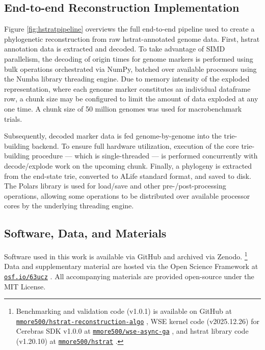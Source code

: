 \subsection{End-to-end Reconstruction Implementation}
\label{sec:pipeline}



Figure \ref{fig:hstratpipeline} overviews the full end-to-end pipeline used to create a phylogenetic reconstruction from raw hstrat-annotated genome data.
First, hstrat annotation data is extracted and decoded.
To take advantage of SIMD parallelism, the decoding of origin times for genome markers is performed using bulk operations orchestrated via NumPy, batched over available processors using the Numba library threading engine.
Due to memory intensity of the exploded representation, where each genome marker constitutes an individual dataframe row, a chunk size may be configured to limit the amount of data exploded at any one time.
A chunk size of 50 million genomes was used for macrobenchmark trials.

Subsequently, decoded marker data is fed genome-by-genome into the trie-building backend.
To ensure full hardware utilization, execution of the core trie-building procedure --- which is single-threaded --- is performed concurrently with decode/explode work on the upcoming chunk.
Finally, a phylogeny is extracted from the end-state trie, converted to ALife standard format, and saved to disk.
The Polars library is used for load/save and other pre-/post-processing operations, allowing some operations to be distributed over available processor cores by the underlying threading engine.

\subsection{Software, Data, and Materials} \label{sec:materials}

Software used in this work is available via GitHub and archived via Zenodo.%
\footnote{\scriptsize Benchmarking and validation code (v1.0.1) is available on GitHub at \href{https://github.com/mmore500/hstrat-reconstruction-algo/tree/v1.0.1}{\texttt{mmore500/hstrat-reconstruction-algo}} \citep{matthew_andres_moreno_2025_16898918}, WSE kernel code (v2025.12.26) for Cerebras SDK v1.0.0 at \href{https://github.com/mmore500/wse-async-ga/tree/v2025.12.26}{\texttt{mmore500/wse-async-ga}} \citep{moreno_2025_16898904}, and hstrat library code (v1.20.10) at \href{https://github.com/mmore500/hstrat/tree/v1.20.10}{\texttt{mmore500/hstrat}} \citep{moreno_2025_16898849}.}
Data and supplementary material are hosted via the Open Science Framework at \href{https://osf.io/63ucz}{\texttt{osf.io/63ucz}} \citep{supplemental,foster2017open}.
All accompanying materials are provided open-source under the MIT License.

